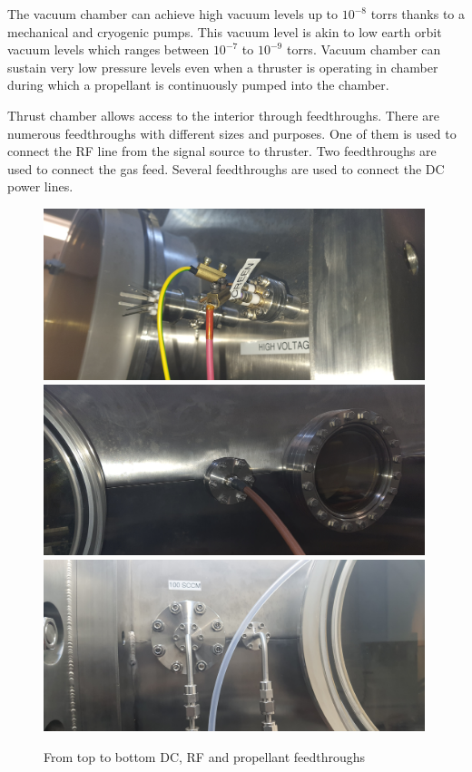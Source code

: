 The vacuum chamber can achieve high vacuum levels up to $10^{-8}$ torrs thanks to a mechanical and cryogenic pumps. This vacuum level is akin to low earth orbit vacuum levels which ranges between $10^{-7}$ to $10^{-9}$ torrs\cite{Horneck2011}. Vacuum chamber can sustain very low pressure levels even when a thruster is operating in chamber during which a propellant is continuously pumped into the chamber. 

\newpage
Thrust chamber allows access to the interior through feedthroughs. There are numerous feedthroughs with different sizes and purposes. One of them is used to connect the RF line from the signal source to thruster. Two feedthroughs are used to connect the gas feed. Several feedthroughs are used to connect the DC power lines. 

\begin{figure}[ht]
    \centering
    \includegraphics[height=5cm]{fig/dcfeedout.jpg}
    \includegraphics[height=5cm]{fig/RFfeedout.jpg}
    \includegraphics[height=5cm]{fig/gasfeedout.jpg}
    \caption{From top to bottom DC, RF and propellant feedthroughs}
    \label{fig:vacuumfeed}
\end{figure}
\newpage
